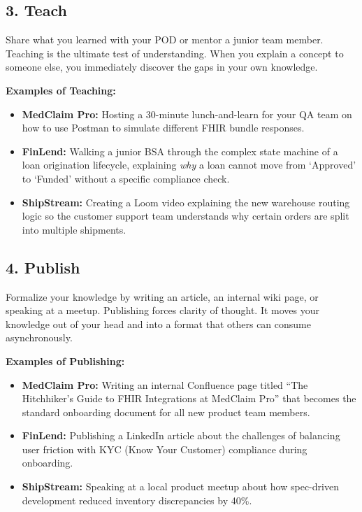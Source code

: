 \documentclass[
  11pt,
  openany,
  oneside]{book}
\providecommand{\tightlist}{%
  \setlength{\itemsep}{0pt}\setlength{\parskip}{0pt}}
\begin{document}
\subsection{3. Teach}\label{teach}

Share what you learned with your POD or mentor a junior team member.
Teaching is the ultimate test of understanding. When you explain a
concept to someone else, you immediately discover the gaps in your own
knowledge.

\textbf{Examples of Teaching:}

\begin{itemize}
\tightlist
\item
  \textbf{MedClaim Pro:} Hosting a 30-minute lunch-and-learn for your QA
  team on how to use Postman to simulate different FHIR bundle
  responses.
\item
  \textbf{FinLend:} Walking a junior BSA through the complex state
  machine of a loan origination lifecycle, explaining \emph{why} a loan
  cannot move from `Approved' to `Funded' without a specific compliance
  check.
\item
  \textbf{ShipStream:} Creating a Loom video explaining the new
  warehouse routing logic so the customer support team understands why
  certain orders are split into multiple shipments.
\end{itemize}

\subsection{4. Publish}\label{publish}

Formalize your knowledge by writing an article, an internal wiki page,
or speaking at a meetup. Publishing forces clarity of thought. It moves
your knowledge out of your head and into a format that others can
consume asynchronously.

\textbf{Examples of Publishing:}

\begin{itemize}
\tightlist
\item
  \textbf{MedClaim Pro:} Writing an internal Confluence page titled
  ``The Hitchhiker's Guide to FHIR Integrations at MedClaim Pro'' that
  becomes the standard onboarding document for all new product team
  members.
\item
  \textbf{FinLend:} Publishing a LinkedIn article about the challenges
  of balancing user friction with KYC (Know Your Customer) compliance
  during onboarding.
\item
  \textbf{ShipStream:} Speaking at a local product meetup about how
  spec-driven development reduced inventory discrepancies by 40\%.
\end{itemize}
\end{document}
